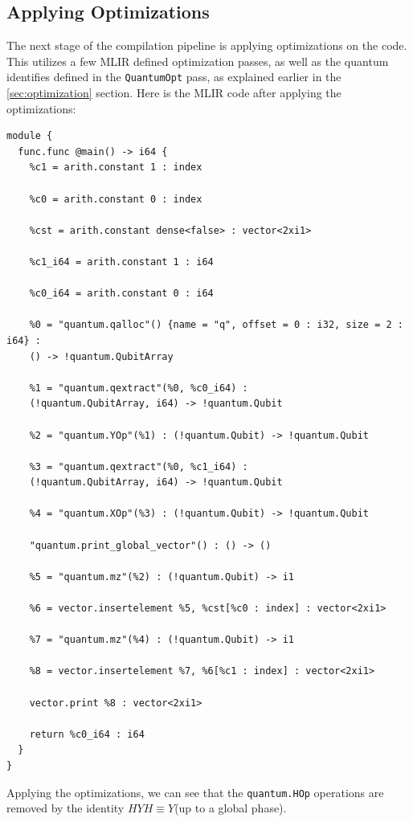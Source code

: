 \subsection{Applying Optimizations}
The next stage of the compilation pipeline is applying optimizations on the code.
This utilizes a few MLIR defined optimization passes, as well as the quantum identifies defined in the \texttt{QuantumOpt} pass,
as explained earlier in the \ref{sec:optimization} section. Here is the MLIR code after applying the optimizations:
\begin{verbatim}
module {
  func.func @main() -> i64 {
    %c1 = arith.constant 1 : index

    %c0 = arith.constant 0 : index

    %cst = arith.constant dense<false> : vector<2xi1>

    %c1_i64 = arith.constant 1 : i64

    %c0_i64 = arith.constant 0 : i64

    %0 = "quantum.qalloc"() {name = "q", offset = 0 : i32, size = 2 : i64} : 
    () -> !quantum.QubitArray

    %1 = "quantum.qextract"(%0, %c0_i64) : 
    (!quantum.QubitArray, i64) -> !quantum.Qubit

    %2 = "quantum.YOp"(%1) : (!quantum.Qubit) -> !quantum.Qubit

    %3 = "quantum.qextract"(%0, %c1_i64) : 
    (!quantum.QubitArray, i64) -> !quantum.Qubit

    %4 = "quantum.XOp"(%3) : (!quantum.Qubit) -> !quantum.Qubit

    "quantum.print_global_vector"() : () -> ()

    %5 = "quantum.mz"(%2) : (!quantum.Qubit) -> i1

    %6 = vector.insertelement %5, %cst[%c0 : index] : vector<2xi1>

    %7 = "quantum.mz"(%4) : (!quantum.Qubit) -> i1

    %8 = vector.insertelement %7, %6[%c1 : index] : vector<2xi1>

    vector.print %8 : vector<2xi1>

    return %c0_i64 : i64
  }
}
\end{verbatim}

Applying the optimizations, we can see that the \texttt{quantum.HOp} operations are removed by 
the identity $HYH \equiv Y$(up to a global phase).

